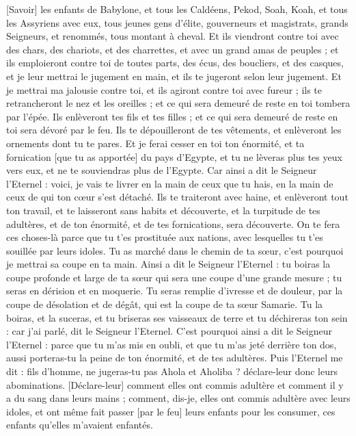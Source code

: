 \begin{multicols}{2}
[Savoir] les enfants de Babylone, et tous les Caldéens, Pekod, Soah, Koah, et tous les Assyriens avec eux, tous jeunes gens d'élite, gouverneurs et magistrats, grands Seigneurs, et renommés, tous montant à cheval.
Et ils viendront contre toi avec des chars, des chariots, et des charrettes, et avec un grand amas de peuples ; et ils emploieront contre toi de toutes parts, des écus, des boucliers, et des casques, et je leur mettrai le jugement en main, et ils te jugeront selon leur jugement.
Et je mettrai ma jalousie contre toi, et ils agiront contre toi avec fureur ; ils te retrancheront le nez et les oreilles ; et ce qui sera demeuré de reste en toi tombera par l'épée. Ils enlèveront tes fils et tes filles ; et ce qui sera demeuré de reste en toi sera dévoré par le feu.
Ils te dépouilleront de tes vêtements, et enlèveront les ornements dont tu te pares.
Et je ferai cesser en toi ton énormité, et ta fornication [que tu as apportée] du pays d'Egypte, et tu ne lèveras plus tes yeux vers eux, et ne te souviendras plus de l'Egypte.
Car ainsi a dit le Seigneur l'Eternel : voici, je vais te livrer en la main de ceux que tu hais, en la main de ceux de qui ton cœur s'est détaché.
Ils te traiteront avec haine, et enlèveront tout ton travail, et te laisseront sans habits et découverte, et la turpitude de tes adultères, et de ton énormité, et de tes fornications, sera découverte.
On te fera ces choses-là parce que tu t'es prostituée aux nations, avec lesquelles tu t'es souillée par leurs idoles.
Tu as marché dans le chemin de ta sœur, c'est pourquoi je mettrai sa coupe en ta main.
Ainsi a dit le Seigneur l'Eternel : tu boiras la coupe profonde et large de ta sœur qui sera une coupe d'une grande mesure ; tu seras en dérision et en moquerie.
Tu seras remplie d'ivresse et de douleur, par la coupe de désolation et de dégât, qui est la coupe de ta sœur Samarie.
Tu la boiras, et la suceras, et tu briseras ses vaisseaux de terre et tu déchireras ton sein : car j'ai parlé, dit le Seigneur l'Eternel.
C'est pourquoi ainsi a dit le Seigneur l'Eternel : parce que tu m'as mis en oubli, et que tu m'as jeté derrière ton dos, aussi porteras-tu la peine de ton énormité, et de tes adultères.
Puis l'Eternel me dit : fils d'homme, ne jugeras-tu pas Ahola et Aholiba ? déclare-leur donc leurs abominations.
[Déclare-leur] comment elles ont commis adultère et comment il y a du sang dans leurs mains ; comment, dis-je, elles ont commis adultère avec leurs idoles, et ont même fait passer [par le feu] leurs enfants pour les consumer, ces enfants qu'elles m'avaient enfantés.

\end{multicols}

